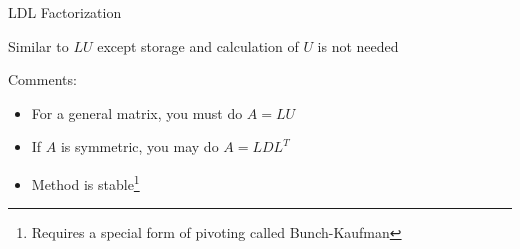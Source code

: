 \documentclass[10pt]{beamer}
\begin{document}

\begin{frame}{LDL Factorization}

{
{Similar to $LU$ except storage and calculation of $U$ is not needed}
}

\vspace{4mm}

Comments:\\[2mm]

\begin{itemize}
    \item For a general matrix, you must do $A=LU$
    \item If $A$ is symmetric, you may do $A=LDL^T$
    \item Method is stable\footnote{Requires a special form of pivoting called Bunch-Kaufman}
\end{itemize}
\end{frame}

\end{document}

